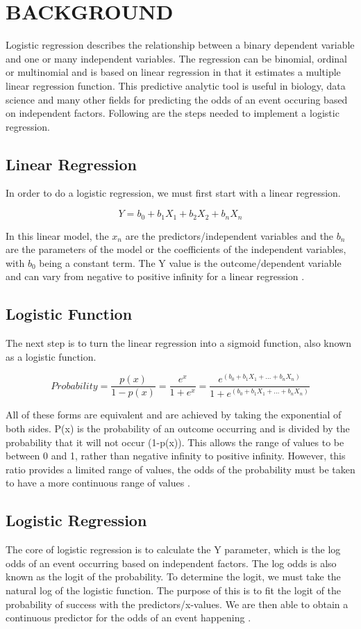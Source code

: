 \documentclass[letterpaper, 10 pt, conference]{ieeeconf}  %
\begin{document}
\section{BACKGROUND}

Logistic regression describes the relationship between a binary dependent variable and one or many independent variables. The regression can be binomial, ordinal or multinomial and is based on linear regression in that it estimates a multiple linear regression function. This predictive analytic tool is useful in biology, data science and many other fields for predicting the odds of an event occuring based on independent factors. Following are the steps needed to implement a logistic regression.

\subsection{Linear Regression}
In order to do a logistic regression, we must first start with a linear regression.

$$Y = b_0 + b_1X_1 + b_2X_2 + b_nX_n$$

In this linear model, the $x_n$ are the predictors/independent variables and the $b_n$ are the parameters of the model or the coefficients of the independent variables, with $b_0$ being a constant term. The Y value is the outcome/dependent variable and can vary from negative to positive infinity for a linear regression \cite{c10} \cite{c1}. 

\subsection{Logistic Function}
The next step is to turn the linear regression into a sigmoid function, also known as a logistic function. 

$$Probability =  \frac{p(x)}{1-p(x)}   =   \frac{e^x}{1+e^x} 
= \frac{e^{(b_0 + b_1X_1 + ... + b_nX_n)}}{1+e^{(b_0 + b_1X_1 + ... + b_nX_n)}}$$

All of these forms are equivalent and are achieved by taking the exponential of both sides. P(x) is the probability of an outcome occurring and is divided by the probability that it will not occur (1-p(x)). This allows the range of values to be between 0 and 1, rather than negative infinity to positive infinity. However, this ratio provides a limited range of values, the odds of the probability must be taken to have a more continuous range of values \cite{c10}. 

\subsection{Logistic Regression} 
The core of logistic regression is to calculate the Y parameter, which is the log odds of an event occurring based on independent factors. The log odds is also known as the logit of the probability. To determine the logit, we must take the natural log of the logistic function. The purpose of this is to fit the logit of the probability of success with the predictors/x-values. We are then able to obtain a continuous predictor for the odds of an event happening \cite{c6}.
\end{document}
